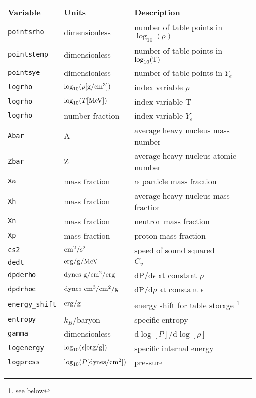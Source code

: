 \documentclass[10pt,nofootinbib]{article}
\newcommand{\code}[1]{\texttt{#1}}
\newenvironment{xaroundtbl}{\begin{flushleft}
  \renewcommand{\footnoterule}{}
  \begin{minipage}{\linewidth}
  \begin{center}}%
 {\end{center}\end{minipage}\end{flushleft}}
\begin{document}
\begin{table}[ht]
\begin{xaroundtbl}
\begin{tabular}{lll}
Variable & Units & Description \\[0.2mm] \hline
\code{pointsrho} & dimensionless & number of table points in
$\log_{10}(\rho)$ \\[0.2mm]
\code{pointstemp} & dimensionless & number of table points in
$\log_{10}(\rm{T})$ \\[0.2mm]
\code{pointsye} & dimensionless & number of table points in $Y_e$
\\[0.2mm]
\code{logrho} & $\log_{10}(\rho [\rm{g}/\rm{cm}^3])$ & index variable
$\rho$\\[0.2mm]
\code{logrho} & $\log_{10}(T [\rm{MeV}])$ & index variable
T\\[0.2mm]
\code{logrho} & number fraction & index variable
$Y_e$\\[0.2mm]
\code{Abar} & A & average heavy nucleus mass number\\[0.2mm]
\code{Zbar} & Z & average heavy nucleus atomic number\\[0.2mm]
\code{Xa} & mass fraction & $\alpha$ particle mass fraction\\[0.2mm]
\code{Xh} & mass fraction & average heavy nucleus mass
fraction\\[0.2mm]
\code{Xn} & mass fraction & neutron mass fraction\\[0.2mm]
\code{Xp} & mass fraction & proton mass fraction\\[0.2mm]
\code{cs2} & $\rm{cm}^2/\rm{s}^2$ & speed of sound squared\\[0.2mm]
\code{dedt} & $\rm{erg}/\rm{g}/\rm{MeV}$ & $C_v$\\[0.2mm]
\code{dpderho} & $\rm{dynes}\ \rm{g}/\rm{cm}^2/\rm{erg}$ & dP/d$\epsilon$ at constant
$\rho$\\[0.2mm]
\code{dpdrhoe} & $\rm{dynes}\ \rm{cm}^3/\rm{cm}^2/\rm{g}$ & dP/d$\rho$ at constant
$\epsilon$\\[0.2mm]
\code{energy\_shift} & $\rm{erg}/\rm{g}$ & energy shift for table storage
\footnote{see below}\\[0.2mm]
\code{entropy} & $k_B$/baryon & specific entropy\\[0.2mm]
\code{gamma} & dimensionless & d$\log{[P]}$/d$\log{[\rho]}$\\[0.2mm]
\code{logenergy} & $\log_{10}(\epsilon [\rm{erg}/\rm{g}])$ & specific internal
energy\\[0.2mm]
\code{logpress} & $\log_{10}(P [\rm{dynes}/\rm{cm}^2])$ & pressure\\[0.2mm]

\end{tabular}
\end{xaroundtbl}
\end{table}
\end{document}
